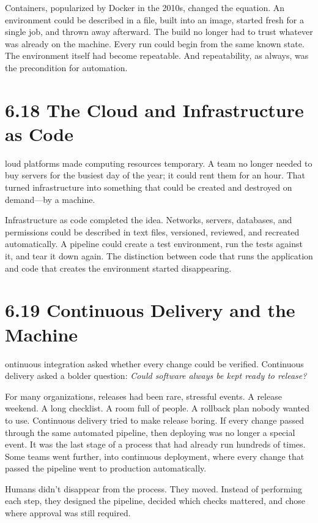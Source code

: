 \documentclass[11pt, a4paper, openany]{book}
\newcommand{\initialcap}[1]{{\fontfamily{lmss}\selectfont\huge\textbf{#1}}}
\begin{document}
\noindent Containers, popularized by Docker in the 2010s, changed the equation. An environment could be described in a file, built into an image, started fresh for a single job, and thrown away afterward. The build no longer had to trust whatever was already on the machine. Every run could begin from the same known state. The environment itself had become repeatable. And repeatability, as always, was the precondition for automation.

\section{6.18 The Cloud and Infrastructure as Code}
\noindent \initialcap{C}loud platforms made computing resources temporary. A team no longer needed to buy servers for the busiest day of the year; it could rent them for an hour. That turned infrastructure into something that could be created and destroyed on demand---by a machine.

\noindent Infrastructure as code completed the idea. Networks, servers, databases, and permissions could be described in text files, versioned, reviewed, and recreated automatically. A pipeline could create a test environment, run the tests against it, and tear it down again. The distinction between code that runs the application and code that creates the environment started disappearing.

\section{6.19 Continuous Delivery and the Machine}
\noindent \initialcap{C}ontinuous integration asked whether every change could be verified. Continuous delivery asked a bolder question: \textit{Could software always be kept ready to release?}

\noindent For many organizations, releases had been rare, stressful events. A release weekend. A long checklist. A room full of people. A rollback plan nobody wanted to use. Continuous delivery tried to make release boring. If every change passed through the same automated pipeline, then deploying was no longer a special event. It was the last stage of a process that had already run hundreds of times. Some teams went further, into continuous deployment, where every change that passed the pipeline went to production automatically.

\noindent Humans didn't disappear from the process. They moved. Instead of performing each step, they designed the pipeline, decided which checks mattered, and chose where approval was still required.
\end{document}
